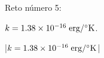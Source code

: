

\bigskip

\enunciadoS Reto n\'umero 5:

$k = 1.38 \times 10^{-16}\; \rm erg/{}^\circ K$.

\bigskip

\respuestaS

|$k = 1.38 \times 10^{-16}\; \rm erg/{}^\circ K$|

\bye

